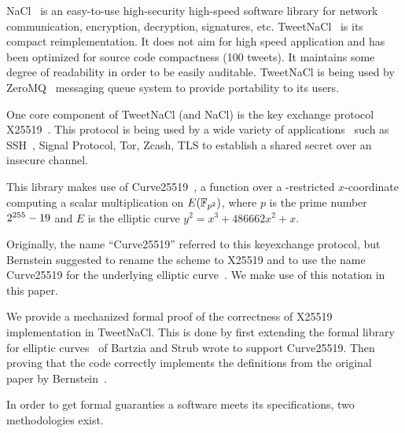 NaCl~\cite{BLS12} is an easy-to-use high-security high-speed software library
for network communication, encryption, decryption, signatures, etc.
TweetNaCl~\cite{BGJ+15} is its compact reimplementation.
It does not aim for high speed application and has been optimized for source
code compactness (100 tweets). It maintains some degree of readability in order
to be easily auditable.
TweetNaCl is being used by ZeroMQ~\cite{zmq} messaging queue system to provide
portability to its users.


One core component of TweetNaCl (and NaCl) is the key exchange protocol X25519~\cite{rfc7748}.
This protocol is being used by a wide variety of applications~\cite{this-that-use-curve25519}
such as SSH~\cite{rfc4253}, Signal Protocol, Tor, Zcash, TLS to establish a shared secret over
an insecure channel.

This library makes use of Curve25519~\cite{Ber06}, a function over a -restricted
$x$-coordinate computing a scalar multiplication on $E(\mathbb{F}_{p^2})$, where $p$ is
the prime number $2^{255}-19$ and $E$ is the elliptic curve $y^2 = x^3 + 486662 x^2 + x$.

Originally, the name ``Curve25519'' referred to this keyexchange protocol,
but Bernstein suggested to rename the scheme to X25519 and to use the name
Curve25519 for the underlying elliptic curve~\cite{Ber14}.
We make use of this notation in this paper.

We provide a mechanized formal proof of the correctness of X25519
implementation in TweetNaCl. This is done by first extending the formal library for
elliptic curves~\cite{DBLP:conf/itp/BartziaS14} of Bartzia and Strub wrote to
support Curve25519. Then proving that the code correctly implements the definitions
from the original paper by Bernstein~\cite{Ber14}.

In order to get formal guaranties a software meets its
specifications, two methodologies exist.

